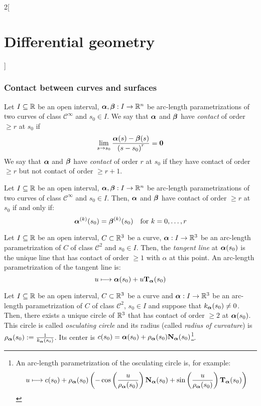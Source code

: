 \documentclass[../../../main_math.tex]{subfiles}
\begin{document}
\begin{multicols}{2}[\section{Differential geometry}]
  \subsubsection{Contact between curves and surfaces}
  \begin{definition}
    Let $I\subseteq\mathbb{R}$ be an open interval, $\boldsymbol{\mathrm{\alpha}},\boldsymbol{\mathrm{\beta}}:I\rightarrow\mathbb{R}^n$ be arc-length parametrizations of two curves of class $\mathcal{C}^\infty$ and $s_0\in I$. We say that $\boldsymbol{\mathrm{\alpha}}$ and $\boldsymbol{\mathrm{\beta}}$ have \emph{contact} of order $\geq r$ at $s_0$ if $$\lim_{s\to s_0}\frac{\boldsymbol{\mathrm{\alpha}}(s)-\boldsymbol{\mathrm{\beta}}(s)}{{(s-s_0)}^r}=\boldsymbol{\mathrm{0}}$$
    We say that $\boldsymbol{\mathrm{\alpha}}$ and $\boldsymbol{\mathrm{\beta}}$ have \emph{contact} of order $r$ at $s_0$ if they have contact of order $\geq r$ but not contact of order $\geq r+1$.
  \end{definition}
  \begin{proposition}
    Let $I\subseteq\mathbb{R}$ be an open interval, $\boldsymbol{\mathrm{\alpha}},\boldsymbol{\mathrm{\beta}}:I\rightarrow\mathbb{R}^n$ be arc-length parametrizations of two curves of class $\mathcal{C}^\infty$ and $s_0\in I$. Then, $\boldsymbol{\mathrm{\alpha}}$ and $\boldsymbol{\mathrm{\beta}}$ have contact of order $\geq r$ at $s_0$ if and only if: $$\boldsymbol{\mathrm{\alpha}}^{(k)}(s_0)=\boldsymbol{\mathrm{\beta}}^{(k)}(s_0)\quad\text{for }k=0,\ldots,r$$
  \end{proposition}
  \begin{proposition}
    Let $I\subseteq\mathbb{R}$ be an open interval, $C\subset\mathbb{R}^3$ be a curve, $\boldsymbol{\mathrm{\alpha}}:I\rightarrow\mathbb{R}^3$ be an arc-length parametrization of $C$ of class $\mathcal{C}^2$ and $s_0\in I$. Then, the \emph{tangent line} at $\boldsymbol{\mathrm{\alpha}}(s_0)$ is the unique line that has contact of order $\geq 1$ with $\alpha$ at this point. An arc-length parametrization of the tangent line is: $$u\longmapsto \boldsymbol{\mathrm{\alpha}}(s_0)+u{\boldsymbol{\mathrm{T}}_{\boldsymbol{\mathrm{\alpha}}}}(s_0)$$
  \end{proposition}
  \begin{proposition}
    Let $I\subseteq\mathbb{R}$ be an open interval, $C\subset\mathbb{R}^3$ be a curve and $\boldsymbol{\mathrm{\alpha}}:I\rightarrow\mathbb{R}^3$ be an arc-length parametrization of $C$ of class $\mathcal{C}^2$, $s_0\in I$ and suppose that $k_{\boldsymbol{\mathrm{\alpha}}}(s_0)\ne 0$. Then, there exists a unique circle of $\mathbb{R}^3$ that has contact of order $\geq 2$ at $\boldsymbol{\mathrm{\alpha}}(s_0)$. This circle is called \emph{osculating circle} and its radius (called \emph{radius of curvature}) is $\rho_{\boldsymbol{\mathrm{\alpha}}}(s_0):=\frac{1}{k_{\boldsymbol{\mathrm{\alpha}}}(s_0)}$. Its center is $c(s_0)=\boldsymbol{\mathrm{\alpha}}(s_0)+\rho_{\boldsymbol{\mathrm{\alpha}}}(s_0){\boldsymbol{\mathrm{N}}_{\boldsymbol{\mathrm{\alpha}}}}(s_0)$\footnote{An arc-length parametrization of the osculating circle is, for example: $$u\longmapsto c(s_0)+\rho_{\boldsymbol{\mathrm{\alpha}}}(s_0)\left(-\cos\left(\frac{u}{\rho_{\boldsymbol{\mathrm{\alpha}}}(s_0)}\right){\boldsymbol{\mathrm{N}}_{\boldsymbol{\mathrm{\alpha}}}}(s_0)+\sin\left(\frac{u}{\rho_{\boldsymbol{\mathrm{\alpha}}}(s_0)}\right){\boldsymbol{\mathrm{T}}_{\boldsymbol{\mathrm{\alpha}}}}(s_0)\right)$$}.

\end{proposition}
\end{multicols}
\end{document}
